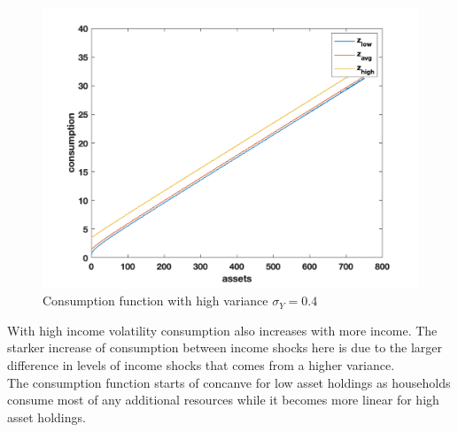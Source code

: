 \documentclass[letterpaper,12pt]{article}
\begin{document}
\begin{figure}
\includegraphics[scale=0.45]{Figures/Part1_PE/consFunc_inf_high}
\caption{Consumption function with high variance $\sigma_Y = 0.4$}
\end{figure}
With high income volatility consumption also increases with more income. The starker increase of consumption between income shocks here is due to the larger difference in levels of income shocks that comes from a higher variance. \\
The consumption function starts of concanve for low asset holdings as households consume most of any additional resources while it becomes more linear for high asset holdings.
\end{document}
